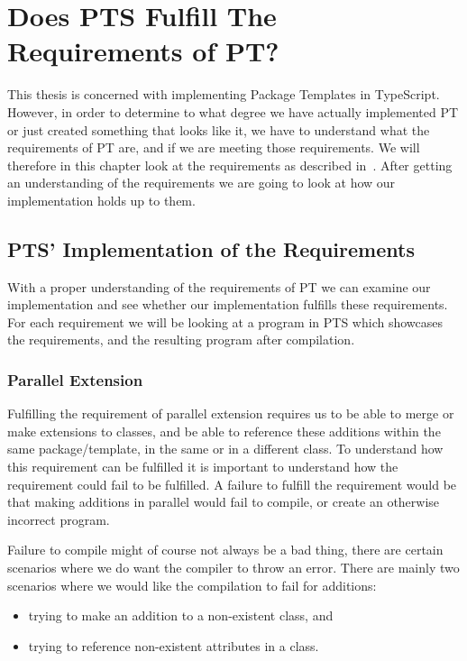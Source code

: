 \section{Does PTS Fulfill The Requirements of PT?}\label{sec:does-pts-fulfill-the-requirements-of-pt?}

This thesis is concerned with implementing Package Templates in TypeScript.
However, in order to determine to what degree we have actually implemented PT or just created something that looks like it, we have to understand what the requirements of PT are, and if we are meeting those requirements.
We will therefore in this chapter look at the requirements as described in~\cite{jot}.
After getting an understanding of the requirements we are going to look at how our implementation holds up to them.



\subsection{PTS' Implementation of the Requirements}\label{subsec:pts'-implementation-of-the-requirements}

With a proper understanding of the requirements of PT we can examine our implementation and see whether our implementation fulfills these requirements.
For each requirement we will be looking at a program in PTS which showcases the requirements, and the resulting program after compilation.


\subsubsection{Parallel Extension}\label{subsubsec:pts-parallel-extension}

Fulfilling the requirement of parallel extension requires us to be able to merge or make extensions to classes, and be able to reference these additions within the same package/template, in the same or in a different class.
To understand how this requirement can be fulfilled it is important to understand how the requirement could fail to be fulfilled.
A failure to fulfill the requirement would be that making additions in parallel would fail to compile, or create an otherwise incorrect program.

Failure to compile might of course not always be a bad thing, there are certain scenarios where we do want the compiler to throw an error.
There are mainly two scenarios where we would like the compilation to fail for additions:
\begin{itemize}
    \item trying to make an addition to a non-existent class, and
    \item trying to reference non-existent attributes in a class.
\end{itemize}

